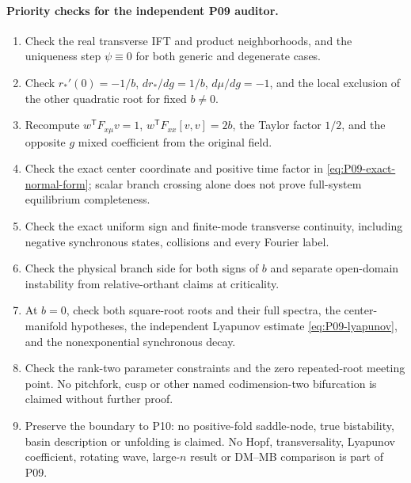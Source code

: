 \paragraph{Priority checks for the independent P09 auditor.}
\begin{enumerate}[leftmargin=*]
\item Check the real transverse IFT and product neighborhoods, and the
uniqueness step $\psi\equiv0$ for both generic and degenerate cases.
\item Check $r_*'(0)=-1/b$, $dr_*/dg=1/b$, $d\mu/dg=-1$,
and the local exclusion of the other quadratic root for fixed $b\ne0$.
\item Recompute $w^{\mathsf T}F_{x\mu}v=1$,
$w^{\mathsf T}F_{xx}[v,v]=2b$, the Taylor factor $1/2$, and the
opposite $g$ mixed coefficient from the original field.
\item Check the exact center coordinate and positive time factor in
\eqref{eq:P09-exact-normal-form}; scalar branch crossing alone does
not prove full-system equilibrium completeness.
\item Check the exact uniform sign and finite-mode transverse continuity,
including negative synchronous states, collisions and every Fourier label.
\item Check the physical branch side for both signs of $b$ and separate
open-domain instability from relative-orthant claims at criticality.
\item At $b=0$, check both square-root roots and their full spectra,
the center-manifold hypotheses, the independent Lyapunov estimate
\eqref{eq:P09-lyapunov}, and the nonexponential synchronous decay.
\item Check the rank-two parameter constraints and the zero repeated-root
meeting point. No pitchfork, cusp or other named codimension-two
bifurcation is claimed without further proof.
\item Preserve the boundary to P10: no positive-fold saddle-node, true
bistability, basin description or unfolding is claimed. No Hopf,
transversality, Lyapunov coefficient, rotating wave, large-$n$ result
or DM--MB comparison is part of P09.
\end{enumerate}
